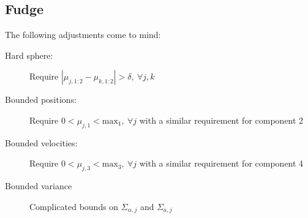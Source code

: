 \documentclass[12pt]{article}
\begin{document}
\subsection{Fudge}
\label{sec:fudge}

The following adjustments come to mind:
\begin{description}
\item[Hard sphere:] Require $\left|\mu_{j,1:2} - \mu_{k,1:2} \right| >
  \delta,~\forall j,k$
\item[Bounded positions:] Require $0 < \mu_{j,1} <
  \text{max}_1,~\forall j$ with a similar requirement for component 2
\item[Bounded velocities:] Require $0 < \mu_{j,3} <
  \text{max}_3,~\forall j$ with a similar requirement for component 4
\item[Bounded variance] Complicated bounds on $\Sigma_{\alpha,j}$ and
  $\Sigma_{a,j}$
\end{description}
\end{document}
